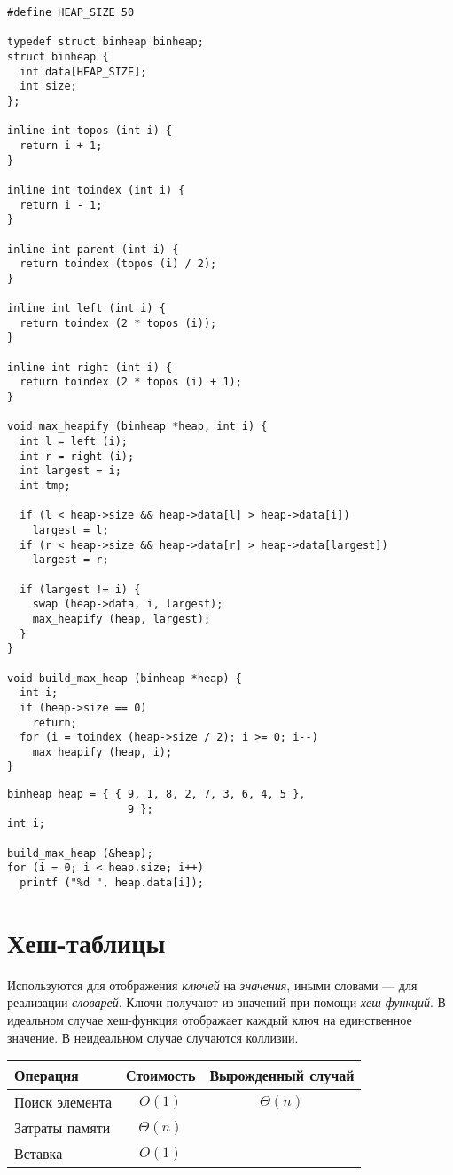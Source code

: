 \lstset{label=lst:binheap-impl,caption=Некоторые операции}
\begin{lstlisting}
#define HEAP_SIZE 50

typedef struct binheap binheap;
struct binheap {
  int data[HEAP_SIZE];
  int size;
};

inline int topos (int i) {
  return i + 1;
}

inline int toindex (int i) {
  return i - 1;
}

inline int parent (int i) {
  return toindex (topos (i) / 2);
}

inline int left (int i) {
  return toindex (2 * topos (i));
}

inline int right (int i) {
  return toindex (2 * topos (i) + 1);
}

void max_heapify (binheap *heap, int i) {
  int l = left (i);
  int r = right (i);
  int largest = i;
  int tmp;

  if (l < heap->size && heap->data[l] > heap->data[i])
    largest = l;
  if (r < heap->size && heap->data[r] > heap->data[largest])
    largest = r;

  if (largest != i) {
    swap (heap->data, i, largest);
    max_heapify (heap, largest);
  }
}

void build_max_heap (binheap *heap) {
  int i;
  if (heap->size == 0)
    return;
  for (i = toindex (heap->size / 2); i >= 0; i--)
    max_heapify (heap, i);
}
\end{lstlisting}

\lstset{label=lst:binheap-usage,caption=Пример использования}
\begin{lstlisting}
binheap heap = { { 9, 1, 8, 2, 7, 3, 6, 4, 5 },
                   9 };
int i;

build_max_heap (&heap);
for (i = 0; i < heap.size; i++)
  printf ("%d ", heap.data[i]);
\end{lstlisting}

\section{Хеш-таблицы}
\label{sec:hash-tables}

Используются для отображения \emph{ключей} на \emph{значения}, иными словами --- для реализации \emph{словарей}. Ключи получают из значений при помощи \emph{хеш-функций}. В идеальном случае хеш-функция отображает каждый ключ на единственное значение. В неидеальном случае случаются коллизии.

\begin{center}
  \begin{tabular}{lcc}
    \toprule
    Операция & Стоимость & Вырожденный случай \\
    \midrule
    Поиск элемента & $O(1)$ & $\Theta(n)$ \\
    Затраты памяти & $\Theta(n)$ & \\
    Вставка & $O(1)$ & \\
    \bottomrule
  \end{tabular}
\end{center}

